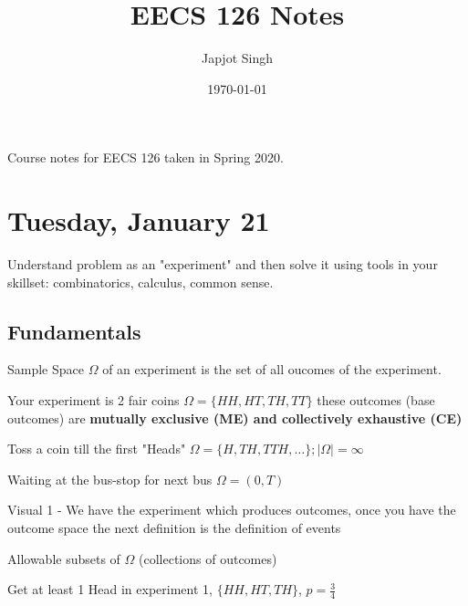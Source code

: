 \documentclass[11pt]{scrartcl}
\begin{document}
\title{\Large EECS 126 Notes}
\author{\large Japjot Singh}
\date{\large\today}

\maketitle

Course notes for EECS 126 taken in Spring 2020. 

\tableofcontents
\newpage

\section{Tuesday, January 21} 
Understand problem as an "experiment" and then solve it using tools in your
skillset: combinatorics, calculus, common sense.
\subsection{Fundamentals}
\begin{definition}
	Sample Space $\Omega$ of an experiment is the set of all oucomes of
the experiment. 
\end{definition}

\begin{example}
	Your experiment is 2 fair coins $\Omega = \{HH, HT, TH, TT\}$
these outcomes (base outcomes) are \textbf{mutually exclusive (ME) and
collectively exhaustive (CE)} 
\end{example} 

\begin{example}
Toss a coin till the first "Heads" $\Omega = \{H, TH, TTH,
\ldots\};|\Omega|= \infty$
\end{example} 

\begin{example}
Waiting  at the bus-stop for next bus $\Omega = (0, T)$
\end{example} 

Visual 1 - We have the experiment which produces outcomes, once you have the
outcome space the next definition is the definition of events

\begin{definition}[Events]
Allowable subsets of $\Omega$ (collections of
outcomes) 
\end{definition}

\begin{example}
Get at least 1 Head in experiment 1, $\{HH, HT, TH\}$,
$p=\frac{3}{4}$ 
\end{example} 
\end{document}
